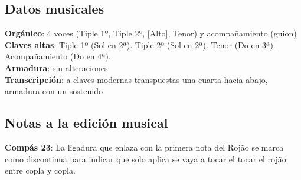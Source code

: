 
\subsection*{Datos musicales}
\noindent \textbf{Orgánico}: 4 voces (Tiple 1º, Tiple 2º, [Alto], Tenor) y acompañamiento (guion)\\
\textbf{Claves altas}: Tiple 1º (Sol en 2ª). Tiple 2º (Sol en 2ª). Tenor (Do en 3ª). Acompañamiento (Do en 4ª).\\
\textbf{Armadura}: sin alteraciones\\
\textbf{Transcripción}: a claves modernas transpuestas una cuarta hacia abajo, armadura con un sostenido

\subsection*{Notas a la edición musical}

\noindent\textbf{Compás 23}: La ligadura que enlaza con la primera nota del Rojão se marca como discontinua para indicar que solo aplica se vaya a tocar el tocar el rojão entre copla y copla. 
